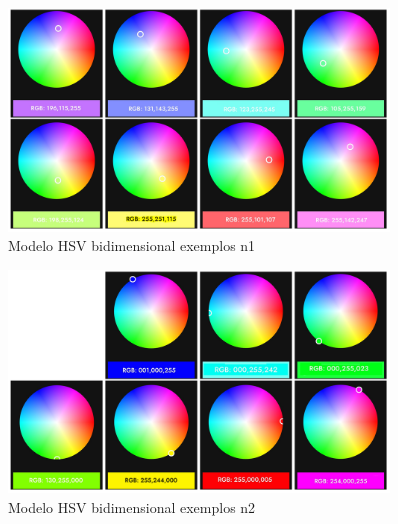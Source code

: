 \begin{figure}[htb]
	\centering
	\includegraphics[width=0.9\textwidth]{figures/example_1_arduino_color}
	\caption{Modelo HSV bidimensional exemplos n1}
	\label{hsv_exemplo_1}
\end{figure}

\begin{figure}[htb]
	\centering
	\includegraphics[width=0.9\textwidth]{figures/example_2_arduino_color}
	\caption{Modelo HSV bidimensional exemplos n2}
	\label{hsv_exemplo_2}
\end{figure}

